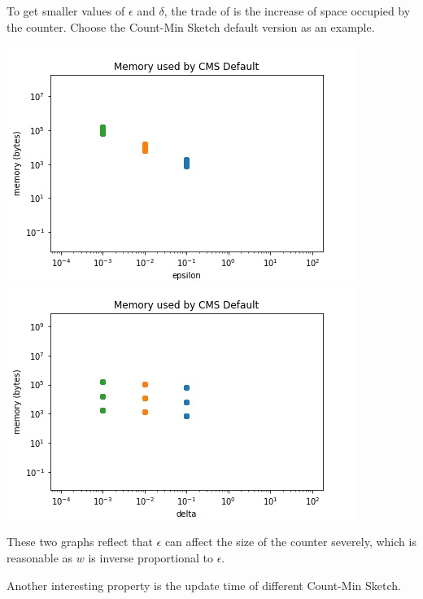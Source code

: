 \documentclass[a4paper, 11pt]{article}
\begin{document}
        \noindent To get smaller values of $\epsilon$ and $\delta$, the trade of is the increase of space occupied by the counter. Choose the Count-Min Sketch default version as an example.

        \begin{center}
            \includegraphics[scale=0.5]{memory_epsilon.jpg}
            \includegraphics[scale=0.5]{memory_delta.jpg}
        \end{center}

        \noindent These two graphs reflect that $\epsilon$ can affect the size of the counter severely, which is reasonable as $w$ is inverse proportional to $\epsilon$.

        \noindent Another interesting property is the update time of different Count-Min Sketch.
\end{document}
